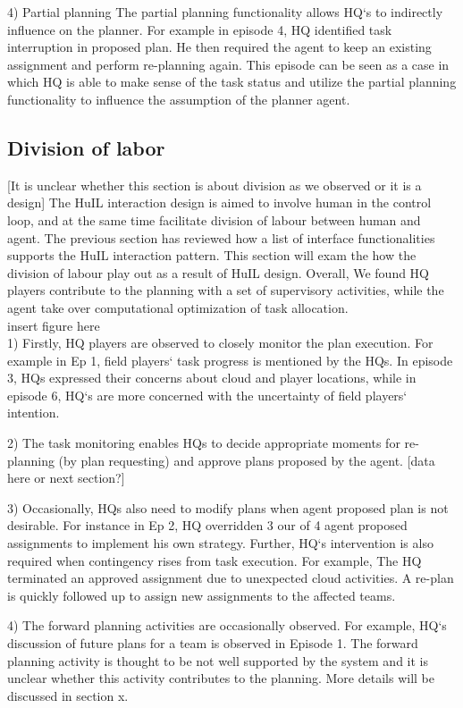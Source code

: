 4) Partial planning
The partial planning functionality allows HQ`s to indirectly influence on the planner. For example in episode 4, HQ identified task interruption in proposed plan. He then required the agent to keep an existing assignment and perform re-planning again.  This episode can be seen as a case in which HQ is able to make sense of the task status and utilize the partial planning functionality to influence the assumption of the planner agent. 


\subsection{ Division of labor }
[It is unclear whether this section is about division as we observed or it is a design]
The HuIL interaction design is aimed to involve human in the control loop, and at the same time facilitate division of labour between human and agent. The previous section has reviewed how a list of interface functionalities supports the HuIL interaction pattern. This section will exam the how the division of labour play out as a result of HuIL design. Overall, We found HQ players contribute to the planning with a set of supervisory activities, while the agent take over computational optimization of task allocation. \\

insert figure here\\


1) Firstly, HQ players are observed to closely monitor the plan execution. For example in Ep 1, field players` task progress is mentioned by the HQs. In episode 3, HQs expressed their concerns about cloud and player locations, while in episode 6, HQ`s are more concerned with the uncertainty of field players` intention. 

2) The task monitoring enables HQs to decide appropriate moments for re-planning (by plan requesting) and approve plans proposed by the agent. [data here or next section?]

3) Occasionally, HQs also need to modify plans when agent proposed plan is not desirable. For instance in Ep 2, HQ overridden 3 our of 4 agent proposed assignments to implement his own strategy. Further, HQ`s intervention is also required when contingency rises from task execution. For example, The HQ terminated an approved assignment due to unexpected cloud activities. A re-plan is quickly followed up to assign new assignments to the affected teams. 

4) The forward planning activities are occasionally observed. For example, HQ`s discussion of future plans for a team is observed in Episode 1. The forward planning activity is thought to be not well supported by the system and it is unclear whether this activity contributes to the planning. More details will be discussed in section x. 


